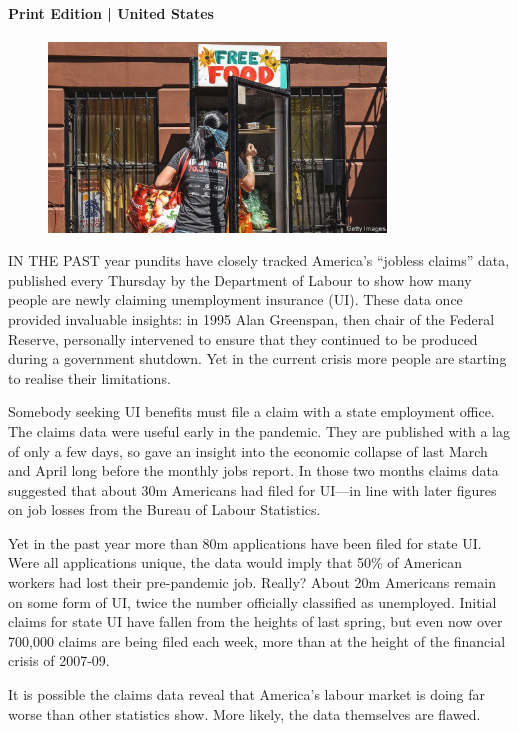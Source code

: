 \documentclass{article}
\begin{document}
\paragraph{Print Edition | United States  \quad \color{gray}{Mar 27th 2021 }}
\begin{figure}[h]
\centering
\includegraphics[width=0.8\textwidth]{images/20210327_USP004_0.jpg}
\end{figure}
\lettrine{I}N THE PAST year pundits have closely tracked America's ``jobless claims'' data, published every Thursday by the Department of Labour to show how many people are newly claiming unemployment insurance (UI). These data once provided invaluable insights: in 1995 Alan Greenspan, then chair of the Federal Reserve, personally intervened to ensure that they continued to be produced during a government shutdown. Yet in the current crisis more people are starting to realise their limitations. 

Somebody seeking UI benefits must file a claim with a state employment office. The claims data were useful early in the pandemic. They are published with a lag of only a few days, so gave an insight into the economic collapse of last March and April long before the monthly jobs report. In those two months claims data suggested that about 30m Americans had filed for UI---in line with later figures on job losses from the Bureau of Labour Statistics. 

Yet in the past year more than 80m applications have been filed for state UI. Were all applications unique, the data would imply that 50\% of American workers had lost their pre-pandemic job. Really? About 20m Americans remain on some form of UI, twice the number officially classified as unemployed. Initial claims for state UI have fallen from the heights of last spring, but even now over 700,000 claims are being filed each week, more than at the height of the financial crisis of 2007-09. 

It is possible the claims data reveal that America's labour market is doing far worse than other statistics show. More likely, the data themselves are flawed. 
\end{document}
